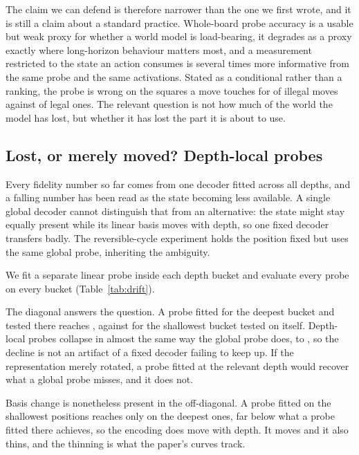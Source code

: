 \documentclass[11pt]{article}
\theoremstyle{remark}
\begin{document}


The claim we can defend is therefore narrower than the one we first wrote, and it
is still a claim about a standard practice. Whole-board probe accuracy is a
usable but weak proxy for whether a world model is load-bearing, it degrades as a
proxy exactly where long-horizon behaviour matters most, and a measurement
restricted to the state an action consumes is several times more informative from
the same probe and the same activations. Stated as a conditional rather than a
ranking, the probe is wrong on the squares a move touches for
 of illegal moves against  of legal ones.
The relevant question is not how much of the world the model has lost, but
whether it has lost the part it is about to use.

\subsection{Lost, or merely moved? Depth-local probes}
\label{sec:drift}

Every fidelity number so far comes from one decoder fitted across all depths, and
a falling number has been read as the state becoming less available. A single global
decoder cannot distinguish that from an alternative: the state might stay equally
present while its linear basis moves with depth, so one fixed decoder transfers
badly. The reversible-cycle experiment holds the position fixed but uses the same
global probe, inheriting the ambiguity.

We fit a separate linear probe inside each depth bucket and evaluate every probe
on every bucket (Table~\ref{tab:drift}).



The diagonal answers the question. A probe fitted for the deepest bucket and
tested there reaches , against  for the
shallowest bucket tested on itself. Depth-local probes collapse in almost the
same way the global probe does,  to , so
the decline is not an artifact of a fixed decoder failing to keep up. If the
representation merely rotated, a probe fitted at the relevant depth would recover
what a global probe misses, and it does not.

Basis change is nonetheless present in the off-diagonal. A probe fitted on the
shallowest positions reaches only  on the deepest ones, far
below what a probe fitted there achieves, so the encoding does move with depth.
It moves and it also thins, and the thinning is what the paper's curves track.
\end{document}
